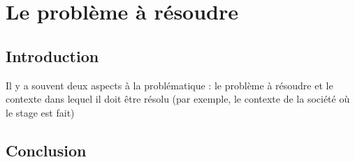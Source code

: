 \chapter{Le problème à résoudre}
\minitoc
\newpage
 
\section{Introduction}

Il y a souvent deux aspects à la problématique : le problème à résoudre et le contexte dans lequel il doit être résolu (par exemple, le contexte de la société où le stage est fait)
 
\section{Conclusion }

